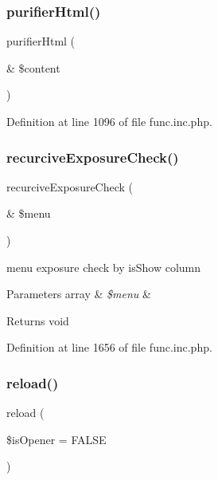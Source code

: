 \subsubsection{\texorpdfstring{purifier\+Html()}{purifierHtml()}}
{\footnotesize\ttfamily purifier\+Html (\begin{DoxyParamCaption}\item[{\&}]{\$content }\end{DoxyParamCaption})}



Definition at line 1096 of file func.\+inc.\+php.

\hypertarget{func_8inc_8php_a229b3ea7ca966e907d266bc60efa353b}{}\label{func_8inc_8php_a229b3ea7ca966e907d266bc60efa353b} 
\subsubsection{\texorpdfstring{recurcive\+Exposure\+Check()}{recurciveExposureCheck()}}
{\footnotesize\ttfamily recurcive\+Exposure\+Check (\begin{DoxyParamCaption}\item[{\&}]{\$menu }\end{DoxyParamCaption})}

menu exposure check by is\+Show column 
\begin{DoxyParams}[1]{Parameters}
array & {\em \$menu} & \\
\hline
\end{DoxyParams}
\begin{DoxyReturn}{Returns}
void 
\end{DoxyReturn}


Definition at line 1656 of file func.\+inc.\+php.

\hypertarget{func_8inc_8php_aaf78eccbde1406d602a7c408a364be24}{}\label{func_8inc_8php_aaf78eccbde1406d602a7c408a364be24} 
\subsubsection{\texorpdfstring{reload()}{reload()}}
{\footnotesize\ttfamily reload (\begin{DoxyParamCaption}\item[{}]{\$is\+Opener = {\ttfamily FALSE} }\end{DoxyParamCaption})}

